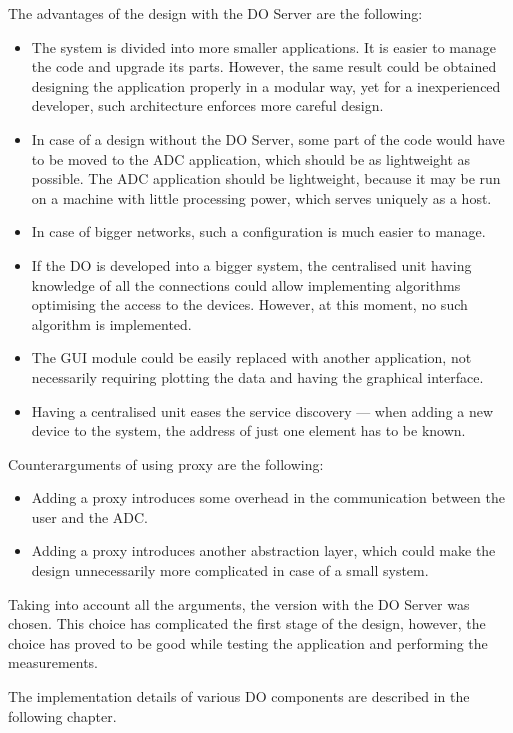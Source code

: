     The advantages of the design with the DO Server are the following:
    \begin{itemize}
        \item The system is divided into more smaller applications. It is easier to manage the code and upgrade its parts. However, the same result could be obtained designing the application properly in a modular way, yet for a inexperienced developer, such architecture enforces more careful design.
        \item In case of a design without the DO Server, some part of the code would have to be moved to the ADC application, which should be as lightweight as possible. The ADC application should be lightweight, because it may be run on a machine with little processing power, which serves uniquely as a host.
        \item In case of bigger networks, such a configuration is much easier to manage.
        \item If the DO is developed into a bigger system, the centralised unit having knowledge of all the connections could allow implementing algorithms optimising the access to the devices. However, at this moment, no such algorithm is implemented.
        \item The GUI module could be easily replaced with another application, not necessarily requiring plotting the data and having the graphical interface.
        \item Having a centralised unit eases the service discovery --- when adding a new device to the system, the address of just one element has to be known.
    \end{itemize}
    Counterarguments of using proxy are the following:
    \begin{itemize}
        \item Adding a proxy introduces some overhead in the communication between the user and the ADC.
        \item Adding a proxy introduces another abstraction layer, which could make the design unnecessarily more complicated in case of a small system. 
    \end{itemize}
    
    Taking into account all the arguments, the version with the DO Server was chosen. This choice has complicated the first stage of the design, however, the choice has proved to be good while testing the application and performing the measurements.
    
    The implementation details of various DO components are described in the following chapter.

